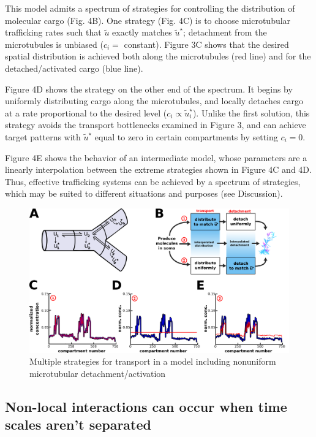 \documentclass[fleqn,10pt]{wlpeerj}
\begin{document}
This model admits a spectrum of strategies for controlling the distribution of molecular cargo (Fig. 4B). One strategy (Fig. 4C) is to choose microtubular trafficking rates such that $\tilde{u}$ exactly matches $\tilde{u}^\star$; detachment from the microtubules is unbiased ($c_i =$ constant). Figure 3C shows that the desired spatial distribution is achieved both along the microtubules (red line) and for the detached/activated cargo (blue line).

Figure 4D shows the strategy on the other end of the spectrum. It begins by uniformly distributing cargo along the microtubules, and locally detaches cargo at a rate proportional to the desired level ($c_i \propto \tilde{u}^\star_i$). Unlike the first solution, this strategy avoids the transport bottlenecks examined in Figure 3, and can achieve target patterns with  $\tilde{u}^\star$ equal to zero in certain compartments by setting $c_i = 0$. 

Figure 4E shows the behavior of an intermediate model, whose parameters are a linearly interpolation between the extreme strategies shown in Figure 4C and 4D. Thus, effective trafficking systems can be achieved by a spectrum of strategies, which may be suited to different situations and purposes (see Discussion). 

\begin{figure}[h!]
\begin{center}
\includegraphics[width=1\columnwidth]{Fig3.png}
\caption{Multiple strategies for transport in a model including nonuniform microtubular detachment/activation}
\end{center}
\end{figure}

\subsection*{Non-local interactions can occur when time scales aren't separated}
\end{document}
